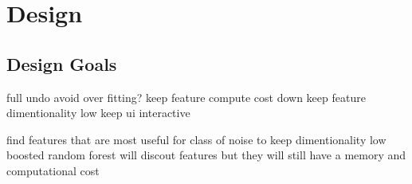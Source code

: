 \chapter{Design} \label{ch:design}

\section{Design Goals}

full undo
avoid over fitting?
keep feature compute cost down
keep feature dimentionality low
keep ui interactive

find features that are most useful for class of noise to keep dimentionality low
boosted random forest will discout features but they will still have a memory and computational cost


